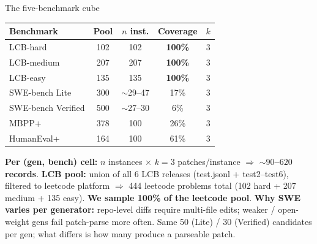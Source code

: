 \documentclass[10pt]{beamer}
\newcommand{\good}[1]{\textcolor{accentGreen}{\textbf{#1}}}
\begin{document}
\begin{frame}{The five-benchmark cube}
\vspace{0.15cm}
\begin{table}
\centering
\footnotesize
\begin{tabular}{lcccc}
\toprule
\rowcolor{paleBlue}
\textbf{Benchmark} & \textbf{Pool} & \textbf{$n$ inst.} &
  \textbf{Coverage} & \textbf{$k$} \\
\midrule
\textcolor{primaryBlue}{LCB-hard}              & 102 & 102 & \good{100\%} & 3 \\
\textcolor{primaryBlue}{LCB-medium}            & 207 & 207 & \good{100\%} & 3 \\
\textcolor{primaryBlue}{LCB-easy}              & 135 & 135 & \good{100\%} & 3 \\
\textcolor{accentGreen}{SWE-bench Lite}        & 300 & $\sim$29--47 & 17\%  & 3 \\
\textcolor{accentGreen}{SWE-bench Verified}    & 500 & $\sim$27--30 & 6\%   & 3 \\
\textcolor{accentOrange}{MBPP+}                & 378 & 100          & 26\% & 3 \\
\textcolor{accentOrange}{HumanEval+}           & 164 & 100          & 61\% & 3 \\
\bottomrule
\end{tabular}
\end{table}

\textcolor{softGrey}{\scriptsize
\textbf{Per (gen, bench) cell:} $n$ instances $\times$ $k{=}3$ patches/instance
$\Rightarrow$ \textbf{$\sim 90$--$620$ records}.
\textbf{LCB pool:} union of all 6 LCB releases (test.jsonl + test2--test6),
filtered to leetcode platform $\Rightarrow$ 444 leetcode problems total
(102 hard + 207 medium + 135 easy). \textbf{We sample 100\% of the leetcode pool}.
\textbf{Why SWE varies per generator:} repo-level diffs require multi-file edits;
weaker / open-weight gens fail patch-parse more often. Same 50 (Lite) / 30
(Verified) candidates per gen; what differs is how many produce a parseable patch.}
\end{frame}
\end{document}
